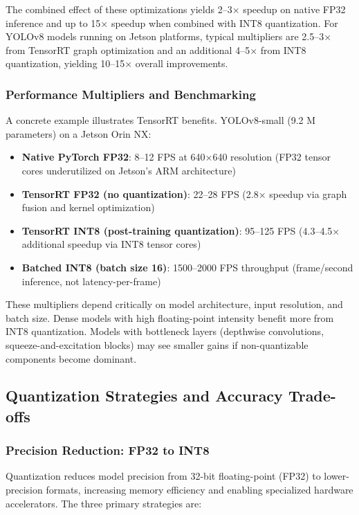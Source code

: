 The combined effect of these optimizations yields 2--3× speedup on native FP32 inference and up to 15× speedup when combined with INT8 quantization. \cite{NVIDIA2024TensorRTModelOptimizer} For YOLOv8 models running on Jetson platforms, typical multipliers are 2.5--3× from TensorRT graph optimization and an additional 4--5× from INT8 quantization, yielding 10--15× overall improvements.



\subsubsection{Performance Multipliers and Benchmarking}

A concrete example illustrates TensorRT benefits. YOLOv8-small (9.2 M parameters) on a Jetson Orin NX:
\begin{itemize}
  \item \textbf{Native PyTorch FP32}: 8--12 FPS at 640×640 resolution (FP32 tensor cores underutilized on Jetson's ARM architecture)
  \item \textbf{TensorRT FP32 (no quantization)}: 22--28 FPS (2.8× speedup via graph fusion and kernel optimization)
  \item \textbf{TensorRT INT8 (post-training quantization)}: 95--125 FPS (4.3--4.5× additional speedup via INT8 tensor cores)
  \item \textbf{Batched INT8 (batch size 16)}: 1500--2000 FPS throughput (frame/second inference, not latency-per-frame)
\end{itemize}

These multipliers depend critically on model architecture, input resolution, and batch size. Dense models with high floating-point intensity benefit more from INT8 quantization. Models with bottleneck layers (depthwise convolutions, squeeze-and-excitation blocks) may see smaller gains if non-quantizable components become dominant.

\subsection{Quantization Strategies and Accuracy Trade-offs}

\subsubsection{Precision Reduction: FP32 to INT8}

Quantization reduces model precision from 32-bit floating-point (FP32) to lower-precision formats, increasing memory efficiency and enabling specialized hardware accelerators. The three primary strategies are:

